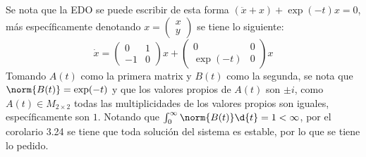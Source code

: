 \documentclass{homework}
\begin{document}
\begin{sol}
    Se nota que la EDO se puede escribir de esta forma \((\ddot{x}+x)+\exp(-t)x=0\), más específicamente denotando \(x=\begin{pmatrix}
        x\\y
    \end{pmatrix}\) se tiene lo siguiente:
    \begin{equation*}
        \dot{x}=\begin{pmatrix}
            0&1\\-1&0
        \end{pmatrix}x+\begin{pmatrix}
            0&0\\\exp(-t)&0
        \end{pmatrix}x
    \end{equation*}
    Tomando \(A(t)\) como la primera matrix y \(B(t)\) como la segunda, se nota que \(\norm{B(t)}=\exp(-t)\) y que los valores propios de \(A(t)\) son \(\pm i\), como \(A(t)\in M_{2\times 2}\) todas las multiplicidades de los valores propios son iguales, específicamente son \(1\). Notando que \(\int_0^\infty\norm{B(t)}\d{t}=1<\infty\), por el corolario 3.24 se tiene que toda solución del sistema es estable, por lo que se tiene lo pedido.
\end{sol}
\end{document}
